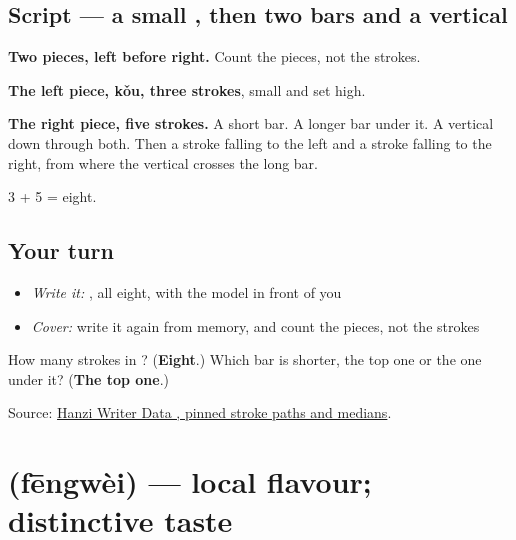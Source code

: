 \subsection*{Script — a small , then two bars and a vertical}

\begin{quote}
\end{quote}

\textbf{Two pieces, left before right.} Count the pieces, not the strokes.

\textbf{The left piece,  kǒu, three strokes}, small and set high.

\textbf{The right piece, five strokes.} A short bar. A longer bar under it. A vertical down through both. Then a stroke falling to the left and a stroke falling to the right, from where the vertical crosses the long bar.

3 + 5 = eight.

\subsection*{Your turn}
\begin{itemize}
\raggedright
  \item \emph{Write it:} , all eight, with the model in front of you
  \item \emph{Cover:} write it again from memory, and count the pieces, not the strokes
\end{itemize}

\begin{tcolorbox}[breakable,colback=teal!4,colframe=teal!35!black,title={Before you move on}]
How many strokes in ? (\textbf{Eight}.) Which bar is shorter, the top one or the one under it? (\textbf{The top one}.)

Source: \href{https://raw.githubusercontent.com/chanind/hanzi-writer-data/68d10a4b21150cae5e1ebbd223eed289cf32d90c/data/\%E5\%91\%B3.json}{Hanzi Writer Data , pinned stroke paths and medians}.
\end{tcolorbox}
\section[\texorpdfstring{\zh{风味} (fēngwèi)}{风味 (fēngwèi)}]{ (fēngwèi) — local flavour; distinctive taste}

\label{lesson:ZH-C449-fengwei}



